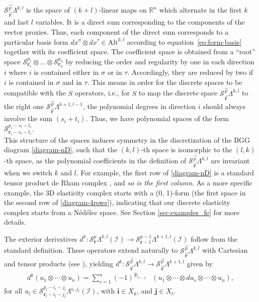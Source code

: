 \documentclass[final]{amsart}%
\newcommand{\charset}{X}
\newcommand{\0}{\mathaccent23}
\newcommand \alt{\mathrm{Alt}}
\newcommand{\br}{\mathbf r}
\newcommand{\vbr}{\vec{\mathbf r}}
\newcommand{\vp}{\vec{p}}
\begin{document}
$\mathscr{S}_{\vbr}^{\vp}\Lambda^{k, l}$ is the space of $(k+l)$-linear maps on $\mathbb R^n$ which alternate in the first $k$ and last $l$ variables. It is a direct sum corresponding to the components of the vector proxies.
Thus, each component of the direct sum corresponds to a particular basis form $dx^\sigma\otimes dx^\tau\in \alt^{k,l}$ according to equation~\eqref{eq:form-basis} together with its coefficient space.
The coefficient space is obtained from a ``root'' space $\mathcal{S}^{p_1}_{\br_1}\otimes\dots\otimes\mathcal{S}^{p_n}_{\br_n}$
by reducing the order and regularity by one in each direction $i$ where $i$ is contained either in $\sigma$ or in $\tau$. Accordingly, they are reduced by two if $i$ is contained in $\sigma$ and in $\tau$.
This means in order for the  discrete spaces to be compatible with the $S$ operators, i.e., for $S$ to map the discrete space $\mathscr{S}_{\vbr}^{\vp}\Lambda^{k, l}$ to the right one $\mathscr{S}_{\vbr}^{\vp}\Lambda^{k+1, l-1}$, the polynomial degrees in direction $i$ should always involve the sum $(s_i+t_i)$. Thus, we have polynomial spaces of the form $\mathcal{S}^{p_{i}-s_i-t_i}_{\br_{i}-s_i-t_i}$.\\
This structure of the spaces induces symmetry in the discretization of the BGG diagram \eqref{diagram-nD}, such that the $(k, l)$-th space is isomorphic to the $(l, k)$-th space, as the polynomial coefficients in the definition of $\mathscr{S}_{\vbr}^{\vp}\Lambda^{k, l}$ are invariant when we switch $k$ and $l$.
For example, the first row of \eqref{diagram-nD} is a standard tensor product de Rham complex \cite{Arnold-Boffi-Bonizzoni,christiansen2009foundations}, and {\it so is the first column}. As a more specific example, the 3D elasticity complex starts with a (0, 1)-form (the first space in the second row of \eqref{diagram-4rows}), indicating that our discrete elasticity complex starts from a N\'ed\'elec space. See Section \ref{sec:examples_fe} for more details.

The exterior derivatives $d^{k}: \mathcal{S}_{\br}^{p}\Lambda^{k, l}(\mathcal{I})\to \mathcal{S}_{\br-1}^{p-1}\Lambda^{k+1, l}(\mathcal{I})$ follow from the standard definition. These operators extend naturally to $\mathscr{S}_{\vbr}^{\vp}\Lambda^{k, l}$ with Cartesian and tensor products (see \cite{Arnold-Boffi-Bonizzoni}), yielding $d^k\colon \mathscr{S}_{\vbr}^{\vp}\Lambda^{k, l}\rightarrow \mathscr{S}_{\vbr}^{\vp}\Lambda^{k+1, l}$ given by
\begin{align*}
d^{k}(u_{1}\otimes \cdots \otimes u_{n})=\sum_{s=1}^{n}(-1)^{|\bm i|_{s-1}}&(u_{1}\otimes \cdots\otimes du_{s}\otimes \cdots\otimes u_{n}),
\end{align*}
for all $u_{l}\in \mathcal{S}^{p_{l}-i_{l}-j_{l}}_{\br_{l}-i_{l}-j_{l}}\Lambda^{i_{l}, j_{l}}(\mathcal{I})$, with $\bm i\in \charset_k$, and $\bm j\in \charset_l$.
\end{document}
